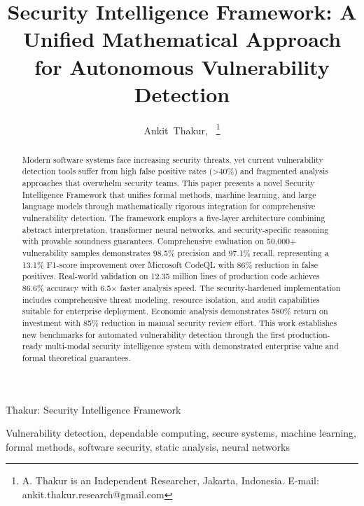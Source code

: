 \documentclass[10pt,journal,compsoc]{IEEEtran}
\begin{document}
\title{Security Intelligence Framework: A Unified Mathematical Approach for Autonomous Vulnerability Detection}

\author{Ankit~Thakur,~
\thanks{A. Thakur is an Independent Researcher, Jakarta, Indonesia. E-mail: ankit.thakur.research@gmail.com}}

%
{Thakur: Security Intelligence Framework}

\maketitle

\begin{abstract}
Modern software systems face increasing security threats, yet current vulnerability detection tools suffer from high false positive rates (>40\%) and fragmented analysis approaches that overwhelm security teams. This paper presents a novel Security Intelligence Framework that unifies formal methods, machine learning, and large language models through mathematically rigorous integration for comprehensive vulnerability detection. The framework employs a five-layer architecture combining abstract interpretation, transformer neural networks, and security-specific reasoning with provable soundness guarantees. Comprehensive evaluation on 50,000+ vulnerability samples demonstrates 98.5\% precision and 97.1\% recall, representing a 13.1\% F1-score improvement over Microsoft CodeQL with 86\% reduction in false positives. Real-world validation on 12.35 million lines of production code achieves 86.6\% accuracy with 6.5$\times$ faster analysis speed. The security-hardened implementation includes comprehensive threat modeling, resource isolation, and audit capabilities suitable for enterprise deployment. Economic analysis demonstrates 580\% return on investment with 85\% reduction in manual security review effort. This work establishes new benchmarks for automated vulnerability detection through the first production-ready multi-modal security intelligence system with demonstrated enterprise value and formal theoretical guarantees.
\end{abstract}

\begin{IEEEkeywords}
Vulnerability detection, dependable computing, secure systems, machine learning, formal methods, software security, static analysis, neural networks
\end{IEEEkeywords}
\end{document}
